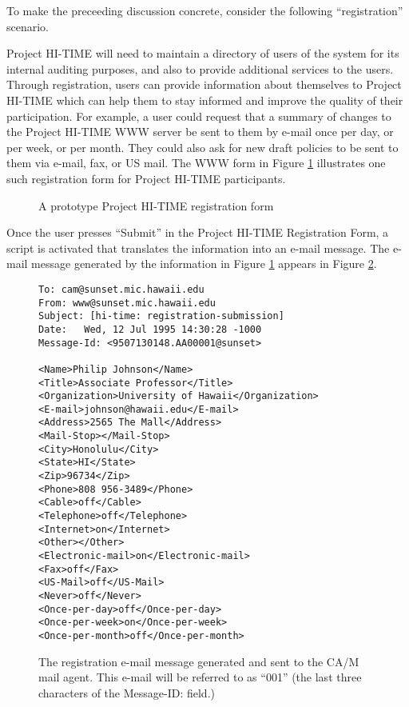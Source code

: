 To make the preceeding discussion concrete, consider the following 
``registration'' scenario.

Project HI-TIME will need to maintain a directory of users of the system
for its internal auditing purposes, and also to provide additional services
to the users.  Through registration, users can provide information about
themselves to Project HI-TIME which can help them to stay informed and
improve the quality of their participation.  For example, a user could
request that a summary of changes to the Project HI-TIME WWW server be sent
to them by e-mail once per day, or per week, or per month.  They could also
ask for new draft policies to be sent to them via e-mail, fax, or US mail.
The WWW form in Figure \ref{fig:registration-example} illustrates one such
registration form for Project HI-TIME participants.

\begin{figure}[htbp]
  \centerline{} 
\caption{A prototype Project HI-TIME registration form} 
\label{fig:registration-example}
\end{figure}

Once the user presses ``Submit'' in the Project HI-TIME Registration Form,
a script is activated that translates the information into an e-mail
message. The e-mail message generated by  the information in 
Figure \ref{fig:registration-example} appears in Figure 
\ref{fig:registration-email}.

\begin{figure}[htbp]
\small\begin{verbatim}
To: cam@sunset.mic.hawaii.edu
From: www@sunset.mic.hawaii.edu
Subject: [hi-time: registration-submission]
Date: 	Wed, 12 Jul 1995 14:30:28 -1000
Message-Id: <9507130148.AA00001@sunset>

<Name>Philip Johnson</Name>
<Title>Associate Professor</Title>
<Organization>University of Hawaii</Organization>
<E-mail>johnson@hawaii.edu</E-mail>
<Address>2565 The Mall</Address>
<Mail-Stop></Mail-Stop> 
<City>Honolulu</City>
<State>HI</State>
<Zip>96734</Zip>
<Phone>808 956-3489</Phone>
<Cable>off</Cable>
<Telephone>off</Telephone>
<Internet>on</Internet>
<Other></Other>
<Electronic-mail>on</Electronic-mail>
<Fax>off</Fax>
<US-Mail>off</US-Mail>
<Never>off</Never>
<Once-per-day>off</Once-per-day>
<Once-per-week>on</Once-per-week>
<Once-per-month>off</Once-per-month>
\end{verbatim}\normalsize
\caption{The registration e-mail message generated and sent to the CA/M
mail agent. This e-mail will be referred to as ``001'' (the last three characters of the
Message-ID: field.)}
\label{fig:registration-email}
\end{figure}

